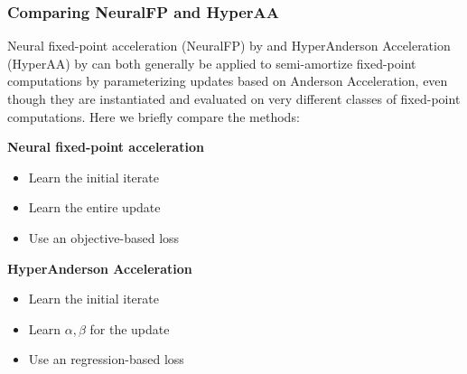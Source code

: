 \documentclass[twoside,11pt]{article}
\begin{document}
\subsubsection{Comparing NeuralFP and HyperAA}
Neural fixed-point acceleration (NeuralFP) by \citet{venkataraman2021neural}
and
HyperAnderson Acceleration (HyperAA) by \citet{bai2022neural}
can both generally be applied to semi-amortize
fixed-point computations by parameterizing updates
based on Anderson Acceleration, even though they are
instantiated and evaluated on very different classes of
fixed-point computations.
Here we briefly compare the methods:
\vspace{8mm}

\noindent
\begin{minipage}[t]{0.5\textwidth}
\noindent\textbf{Neural fixed-point acceleration}
\begin{itemize}[leftmargin=*,noitemsep]
\item Learn the initial iterate
\item Learn the entire update
\item Use an objective-based loss
\end{itemize}
\end{minipage}
\begin{minipage}[t]{0.5\textwidth}
\textbf{HyperAnderson Acceleration}
\begin{itemize}[leftmargin=*,noitemsep]
\item Learn the initial iterate
\item Learn $\alpha,\beta$ for the update
\item Use an regression-based loss
\end{itemize}
\end{minipage}
\end{document}
